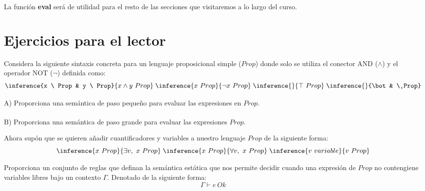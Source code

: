    La función \textbf{eval} será de utilidad para el resto de las secciones que visitaremos a lo largo del curso.

    \newpage
    
    \section{Ejercicios para el lector}

    \begin{exercise}
        Considera la siguiente sintaxis concreta para un lenguaje proposicional simple ($Prop$) donde solo se utiliza el conector AND ($\wedge$) y el operador NOT ($\neg$) definida como: \\
        \[
            \inference{x \ Prop & y \ Prop}{ x \wedge y \ Prop} \; \inference{x \ Prop}{\neg x \ Prop} \; \inference{}{\top \ Prop} \; \inference{}{\bot & \ Prop} 
        \] 

        A) Proporciona una semántica de paso pequeño para evaluar las expresiones en $Prop$.\\\\
        B) Proporciona una semántica de paso grande para evaluar las expresiones $Prop$.
    \end{exercise}

    \bigskip

    \begin{exercise}
        Ahora supón que se quieren añadir cuantificadores y variables a nuestro lenguaje $Prop$ de la siguiente forma: \\
        \[
            \inference{x \ Prop}{\exists v, \ x \ Prop} \; \inference{x \ Prop}{\forall v,\ x \ Prop} \; \inference{v \ variable}{v \ Prop} 
        \]

        Proporciona un conjunto de reglas que definan la semántica estática que nos permite decidir cuando una expresión de $Prop$ no contengiene variables libres bajo un contexto $\Gamma$. Denotado de la siguiente forma: \\
        $$ \Gamma \vdash e \ Ok $$ 

    \end{exercise}

